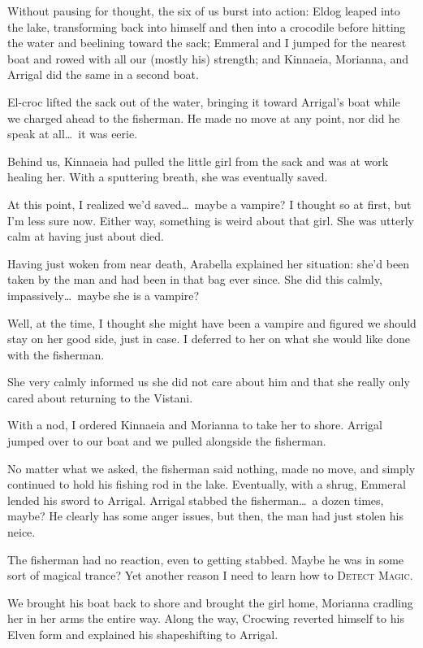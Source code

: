 Without pausing for thought, the six of us burst into action: Eldog leaped into the lake, transforming back into himself and then into a crocodile before hitting the water and beelining toward the sack; Emmeral and I jumped for the nearest boat and rowed with all our (mostly his) strength; and Kinnaeia, Morianna, and Arrigal did the same in a second boat.

El-croc lifted the sack out of the water, bringing it toward Arrigal's boat while we charged ahead to the fisherman. He made no move at any point, nor did he speak at all\dots\ it was eerie.

Behind us, Kinnaeia had pulled the little girl from the sack and was at work healing her. With a sputtering breath, she was eventually saved.

At this point, I realized we'd saved\dots\ maybe a vampire? I thought so at first, but I'm less sure now. Either way, something is weird about that girl. She was utterly calm at having just about died.

Having just woken from near death, Arabella explained her situation: she'd been taken by the man and had been in that bag ever since. She did this calmly, impassively\dots\ maybe she is a vampire?

Well, at the time, I thought she might have been a vampire and figured we should stay on her good side, just in case. I deferred to her on what she would like done with the fisherman.

She very calmly informed us she did not care about him and that she really only cared about returning to the Vistani.

With a nod, I ordered Kinnaeia and Morianna to take her to shore. Arrigal jumped over to our boat and we pulled alongside the fisherman.

No matter what we asked, the fisherman said nothing, made no move, and simply continued to hold his fishing rod in the lake. Eventually, with a shrug, Emmeral lended his sword to Arrigal. Arrigal stabbed the fisherman\dots\ a dozen times, maybe? He clearly has some anger issues, but then, the man had just stolen his neice.

The fisherman had no reaction, even to getting stabbed. Maybe he was in some sort of magical trance? Yet another reason I need to learn how to \textsc{Detect Magic}.

We brought his boat back to shore and brought the girl home, Morianna cradling her in her arms the entire way. Along the way, Crocwing reverted himself to his Elven form and explained his shapeshifting to Arrigal.


